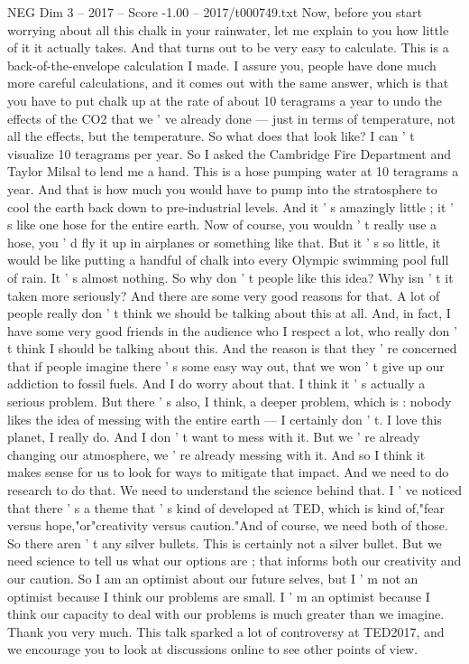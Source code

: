 \begin{textsample}{NEG Dim 3 – 2017 – Score -1.00 – 2017/t000749.txt}
Now, before you start worrying about all this chalk in your rainwater, let me explain to you how little of it it actually takes.
And that turns out to be very easy to calculate.
This is a back-of-the-envelope calculation I made.
I assure you, people have done much more careful calculations, and it comes out with the same answer, which is that you have to put chalk up at the rate of about 10 teragrams a year to undo the effects of the CO2 that we ' ve already done — just in terms of temperature, not all the effects, but the temperature.
So what does that look like?
I can ' t visualize 10 teragrams per year.
So I asked the Cambridge Fire Department and Taylor Milsal to lend me a hand.
This is a hose pumping water at 10 teragrams a year.
And that is how much you would have to pump into the stratosphere to cool the earth back down to pre-industrial levels.
And it ' s amazingly little ; it ' s like one hose for the entire earth.
Now of course, you wouldn ' t really use a hose, you ' d fly it up in airplanes or something like that.
But it ' s so little, it would be like putting a handful of chalk into every Olympic swimming pool full of rain.
It ' s almost nothing.
So why don ' t people like this idea?
Why isn ' t it taken more seriously?
And there are some very good reasons for that.
A lot of people really don ' t think we should be talking about this at all.
And, in fact, I have some very good friends in the audience who I respect a lot, who really don ' t think I should be talking about this.
And the reason is that they ' re concerned that if people imagine there ' s some easy way out, that we won ' t give up our addiction to fossil fuels.
And I do worry about that.
I think it ' s actually a serious problem.
But there ' s also, I think, a deeper problem, which is : nobody likes the idea of messing with the entire earth — I certainly don ' t.
I love this planet, I really do.
And I don ' t want to mess with it.
But we ' re already changing our atmosphere, we ' re already messing with it.
And so I think it makes sense for us to look for ways to mitigate that impact.
And we need to do research to do that.
We need to understand the science behind that.
I ' ve noticed that there ' s a theme that ' s kind of developed at TED, which is kind of,"fear versus hope,"or"creativity versus caution."And of course, we need both of those.
So there aren ' t any silver bullets.
This is certainly not a silver bullet.
But we need science to tell us what our options are ; that informs both our creativity and our caution.
So I am an optimist about our future selves, but I ' m not an optimist because I think our problems are small.
I ' m an optimist because I think our capacity to deal with our problems is much greater than we imagine.
Thank you very much.
This talk sparked a lot of controversy at TED2017, and we encourage you to look at discussions online to see other points of view.

\end{textsample}
